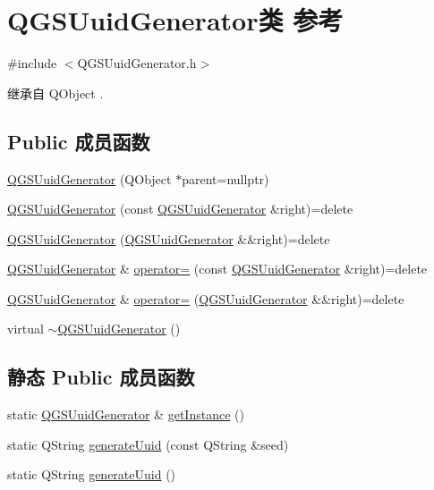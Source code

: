 \hypertarget{class_q_g_s_uuid_generator}{}\section{Q\+G\+S\+Uuid\+Generator类 参考}
\label{class_q_g_s_uuid_generator}


{\ttfamily \#include $<$Q\+G\+S\+Uuid\+Generator.\+h$>$}



继承自 Q\+Object .

\subsection*{Public 成员函数}
\begin{DoxyCompactItemize}
\item 
\mbox{\hyperlink{class_q_g_s_uuid_generator_a677cf81490c49b682a8024a88c2e66f9}{Q\+G\+S\+Uuid\+Generator}} (Q\+Object $\ast$parent=nullptr)
\item 
\mbox{\hyperlink{class_q_g_s_uuid_generator_a31c0c79a830e6e9d599fcac3b8e7e804}{Q\+G\+S\+Uuid\+Generator}} (const \mbox{\hyperlink{class_q_g_s_uuid_generator}{Q\+G\+S\+Uuid\+Generator}} \&right)=delete
\item 
\mbox{\hyperlink{class_q_g_s_uuid_generator_abed5afa202acb241f3bfa822614bee7b}{Q\+G\+S\+Uuid\+Generator}} (\mbox{\hyperlink{class_q_g_s_uuid_generator}{Q\+G\+S\+Uuid\+Generator}} \&\&right)=delete
\item 
\mbox{\hyperlink{class_q_g_s_uuid_generator}{Q\+G\+S\+Uuid\+Generator}} \& \mbox{\hyperlink{class_q_g_s_uuid_generator_a841052f1c46925a36b5155ca904c37ce}{operator=}} (const \mbox{\hyperlink{class_q_g_s_uuid_generator}{Q\+G\+S\+Uuid\+Generator}} \&right)=delete
\item 
\mbox{\hyperlink{class_q_g_s_uuid_generator}{Q\+G\+S\+Uuid\+Generator}} \& \mbox{\hyperlink{class_q_g_s_uuid_generator_a3fc83cbe69e9a182caa4d447ae293c78}{operator=}} (\mbox{\hyperlink{class_q_g_s_uuid_generator}{Q\+G\+S\+Uuid\+Generator}} \&\&right)=delete
\item 
virtual \mbox{\hyperlink{class_q_g_s_uuid_generator_a8bb4c1fbb65cd4f3692cc6a4b28a341c}{$\sim$\+Q\+G\+S\+Uuid\+Generator}} ()
\end{DoxyCompactItemize}
\subsection*{静态 Public 成员函数}
\begin{DoxyCompactItemize}
\item 
static \mbox{\hyperlink{class_q_g_s_uuid_generator}{Q\+G\+S\+Uuid\+Generator}} \& \mbox{\hyperlink{class_q_g_s_uuid_generator_a14994ddc7a73f466c66717202f7bf40c}{get\+Instance}} ()
\item 
static Q\+String \mbox{\hyperlink{class_q_g_s_uuid_generator_a09a392a6d976babf2976806357fc3b9d}{generate\+Uuid}} (const Q\+String \&seed)
\item 
static Q\+String \mbox{\hyperlink{class_q_g_s_uuid_generator_af1a4574f5be42e45a0c4017ad329776c}{generate\+Uuid}} ()
\end{DoxyCompactItemize}


